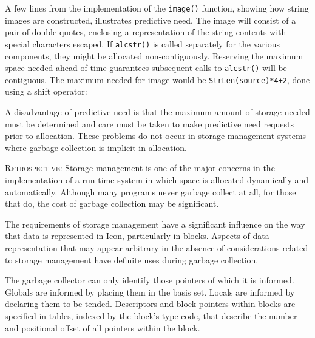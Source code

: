 A few lines from the implementation of the \texttt{image()} function,
showing how string images are constructed, illustrates predictive
need. The image will consist of a pair of double quotes, enclosing a
representation of the string contents with special characters
escaped. If \texttt{alcstr()} is called separately for the various
components, they might be allocated non-contiguously. Reserving the
maximum space needed ahead of time guarantees subsequent calls to
\texttt{alcstr()} will be contiguous. The maximum needed for image
would be \texttt{StrLen(source)*4+2}, done using a shift operator:

\goodbreak
{}

A disadvantage of predictive need is that the maximum amount of
storage needed must be determined and care must be taken to make
predictive need requests prior to allocation. These problems do not
occur in storage-management systems where garbage collection is
implicit in allocation.


\textsc{Retrospective}: Storage management is one of the major
concerns in the implementation of a run-time system in which space is
allocated dynamically and automatically. Although many programs never
garbage collect at all, for those that do, the cost of garbage
collection may be significant.

The requirements of storage management have a significant influence on
the way that data is represented in Icon, particularly in
blocks. Aspects of data representation that may appear arbitrary in
the absence of considerations related to storage management have
definite uses during garbage collection.

The garbage collector can only identify those pointers of which it is
informed. Globals are informed by placing them in the basis
set. Locals are informed by declaring them to be tended. Descriptors
and block pointers within blocks are specified in tables, indexed by
the block's type code, that describe the number and positional offset
of all pointers within the block.

